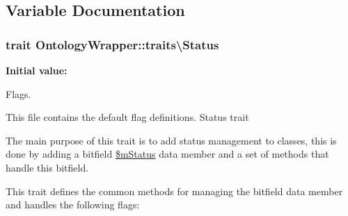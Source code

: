 \subsection{Variable Documentation}
\hypertarget{namespace_ontology_wrapper_1_1traits_abc477d51641d17c4e149e2cd0093c771}{
\subsubsection[{Status}]{\setlength{\rightskip}{0pt plus 5cm}trait Ontology\-Wrapper\-::traits\textbackslash{}\-Status}}\label{namespace_ontology_wrapper_1_1traits_abc477d51641d17c4e149e2cd0093c771}
{\bfseries Initial value\-:}
Flags.

This file contains the default flag definitions. Status trait

The main purpose of this trait is to add status management to classes, this is done by adding a bitfield \hyperlink{}{\$m\-Status} data member and a set of methods that handle this bitfield.

This trait defines the common methods for managing the bitfield data member and handles the following flags\-:


